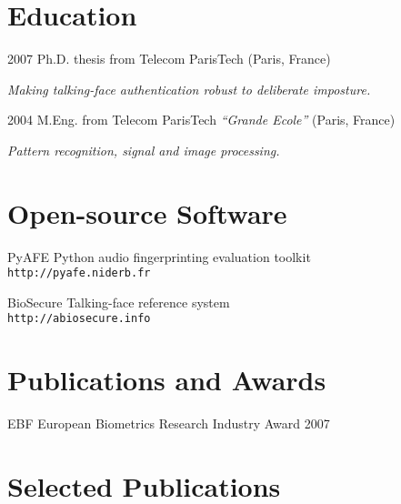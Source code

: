 \documentclass{simplecv}
\begin{document}
\section{Education}

\begin{topic}
\item[2007] Ph.D. thesis from Telecom ParisTech (Paris, France)

\emph{Making talking-face authentication robust to deliberate imposture.}

\item[2004] M.Eng. from Telecom ParisTech \emph{``Grande Ecole''} (Paris, France)

\emph{Pattern recognition, signal and image processing.}
\end{topic}

\section{Open-source Software}
\begin{topic}
\item[PyAFE] Python audio fingerprinting evaluation toolkit~\cite{Ramona2011}\\
\texttt{\small http://pyafe.niderb.fr}
\item[BioSecure] Talking-face reference system~\cite{Bredin2006a}\\
\texttt{\small http://abiosecure.info}
\end{topic}

\section{Publications and Awards}
EBF European Biometrics Research Industry Award 2007~\cite{Bredin2008}

\section{Selected Publications}
\nocite{Bredin2012,Bredin2012a,Ramona2011,Bredin2009,Bredin2008,Bredin2007,Argones-Rua2007a,Bredin2006a}



\end{document}
